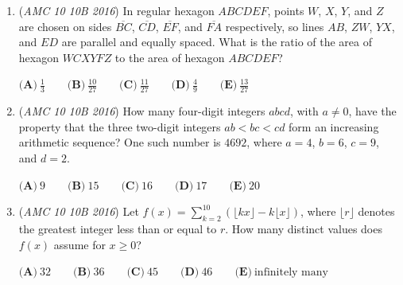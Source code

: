\begin{enumerate}
	\item (\textit{AMC 10 10B 2016}) In regular hexagon $ABCDEF$, points $W$, $X$, $Y$, and $Z$ are chosen on sides $\overline{BC}$, $\overline{CD}$, $\overline{EF}$, and $\overline{FA}$ respectively, so lines $AB$, $ZW$, $YX$, and $ED$ are parallel and equally spaced. What is the ratio of the area of hexagon $WCXYFZ$ to the area of hexagon $ABCDEF$?


 $\textbf{(A)}\ \frac{1}{3}\qquad\textbf{(B)}\ \frac{10}{27}\qquad\textbf{(C)}\ \frac{11}{27}\qquad\textbf{(D)}\ \frac{4}{9}\qquad\textbf{(E)}\ \frac{13}{27}$


	\item (\textit{AMC 10 10B 2016}) How many four-digit integers $abcd$, with $a \neq 0$, have the property that the three two-digit integers $ab<bc<cd$ form an increasing arithmetic sequence? One such number is $4692$, where $a=4$, $b=6$, $c=9$, and $d=2$.


 $\textbf{(A)}\ 9\qquad\textbf{(B)}\ 15\qquad\textbf{(C)}\ 16\qquad\textbf{(D)}\ 17\qquad\textbf{(E)}\ 20$


	\item (\textit{AMC 10 10B 2016}) Let $f(x)=\sum_{k=2}^{10}(\lfloor kx \rfloor -k \lfloor x \rfloor)$, where $\lfloor r \rfloor$ denotes the greatest integer less than or equal to $r$. How many distinct values does $f(x)$ assume for $x \ge 0$?


 $\textbf{(A)}\ 32\qquad\textbf{(B)}\ 36\qquad\textbf{(C)}\ 45\qquad\textbf{(D)}\ 46\qquad\textbf{(E)}\ \text{infinitely many}$


\end{enumerate}
